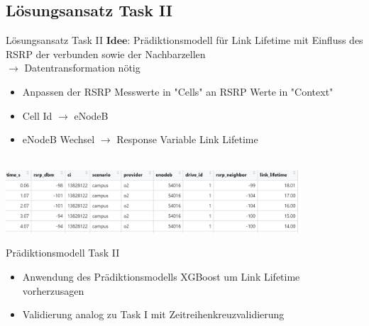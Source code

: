 \subsection{Lösungsansatz Task II}


\begin{frame}{Lösungsansatz Task II}
$\textbf{Idee}$: Prädiktionsmodell für Link Lifetime mit Einfluss des RSRP der verbunden sowie der Nachbarzellen \\
$\rightarrow$ Datentransformation nötig
	\begin{itemize}
		\item Anpassen der RSRP Messwerte in "Cells" an RSRP Werte in "Context"
		\item Cell Id $\rightarrow$ eNodeB 
		\item eNodeB Wechsel $\rightarrow$ Response Variable Link Lifetime
	\end{itemize} 

\quad\\

\includegraphics[width = 11cm]{table}
\end{frame}

\begin{frame}{Prädiktionsmodell Task II}
	\begin{itemize}
		\item Anwendung des Prädiktionsmodells XGBoost um Link Lifetime vorherzusagen 
		\item Validierung analog zu Task I mit Zeitreihenkreuzvalidierung
	\end{itemize}
\end{frame}